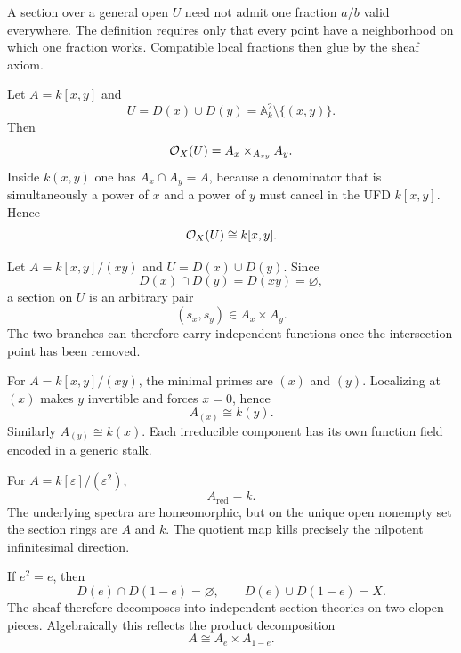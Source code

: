 \begin{example}
A section over a general open $U$ need not admit one fraction $a/b$ valid everywhere.  The definition requires only that every point have a neighborhood on which one fraction works.  Compatible local fractions then glue by the sheaf axiom.
\end{example}

\begin{example}
Let $A=k[x,y]$ and
\[
U=D(x)\cup D(y)=\mathbb A^2_k\setminus\{(x,y)\}.
\]
Then
\[
\mathcal O_X(U)=A_x\times_{A_{xy}}A_y.
\]
Inside $k(x,y)$ one has $A_x\cap A_y=A$, because a denominator that is simultaneously a power of $x$ and a power of $y$ must cancel in the UFD $k[x,y]$.  Hence
\[
\mathcal O_X(U)\cong k[x,y].
\]
\end{example}

\begin{example}
Let $A=k[x,y]/(xy)$ and $U=D(x)\cup D(y)$.  Since
\[
D(x)\cap D(y)=D(xy)=\varnothing,
\]
a section on $U$ is an arbitrary pair
\[
(s_x,s_y)\in A_x\times A_y.
\]
The two branches can therefore carry independent functions once the intersection point has been removed.
\end{example}

\begin{example}
For $A=k[x,y]/(xy)$, the minimal primes are $(x)$ and $(y)$.  Localizing at $(x)$ makes $y$ invertible and forces $x=0$, hence
\[
A_{(x)}\cong k(y).
\]
Similarly $A_{(y)}\cong k(x)$.  Each irreducible component has its own function field encoded in a generic stalk.
\end{example}

\begin{example}
For $A=k[\varepsilon]/(\varepsilon^2)$,
\[
A_{\mathrm{red}}=k.
\]
The underlying spectra are homeomorphic, but on the unique open nonempty set the section rings are $A$ and $k$.  The quotient map kills precisely the nilpotent infinitesimal direction.
\end{example}

\begin{example}
If $e^2=e$, then
\[
D(e)\cap D(1-e)=\varnothing,
\qquad
D(e)\cup D(1-e)=X.
\]
The sheaf therefore decomposes into independent section theories on two clopen pieces.  Algebraically this reflects the product decomposition
\[
A\cong A_e\times A_{1-e}.
\]
\end{example}

